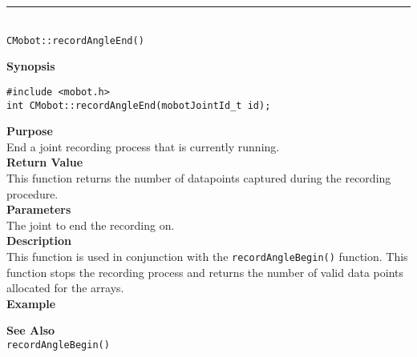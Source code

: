\noindent
\vspace{5pt}
\rule{4.5in}{0.015in}\\
\noindent
{\LARGE \texttt{CMobot::recordAngleEnd()}}\\
{}

\noindent
{\bf Synopsis}
\vspace{-8pt}
\begin{verbatim}
#include <mobot.h>
int CMobot::recordAngleEnd(mobotJointId_t id);
\end{verbatim}

\noindent
{\bf Purpose}\\
End a joint recording process that is currently running.\\

\noindent
{\bf Return Value}\\
This function returns the number of datapoints captured during the recording procedure.\\

\noindent
{\bf Parameters}\\
The joint to end the recording on. \\

\noindent
{\bf Description}\\
This function is used in conjunction with the \texttt{recordAngleBegin()} function. 
This function stops the recording process and returns the number of valid data points
allocated for the arrays.\\

\noindent
{\bf Example}\\
\noindent

\noindent
{\bf See Also}\\
\texttt{recordAngleBegin()} \\
